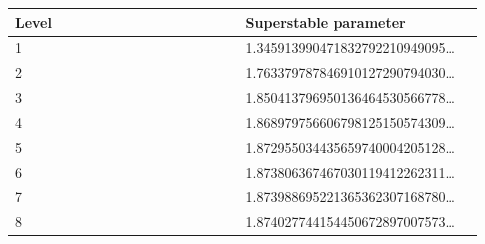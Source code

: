 \begingroup\small
\begin{longtable}{p{0.465\linewidth}p{0.465\linewidth}}
\hline
Level & Superstable parameter \\
\hline
1 & 1.345913990471832792210949095… \\
2 & 1.763379787846910127290794030… \\
3 & 1.850413796950136464530566778… \\
4 & 1.868979756606798125150574309… \\
5 & 1.872955034435659740004205128… \\
6 & 1.873806367467030119412262311… \\
7 & 1.873988695221365362307168780… \\
8 & 1.874027744154450672897007573… \\
\hline\end{longtable}
\endgroup

